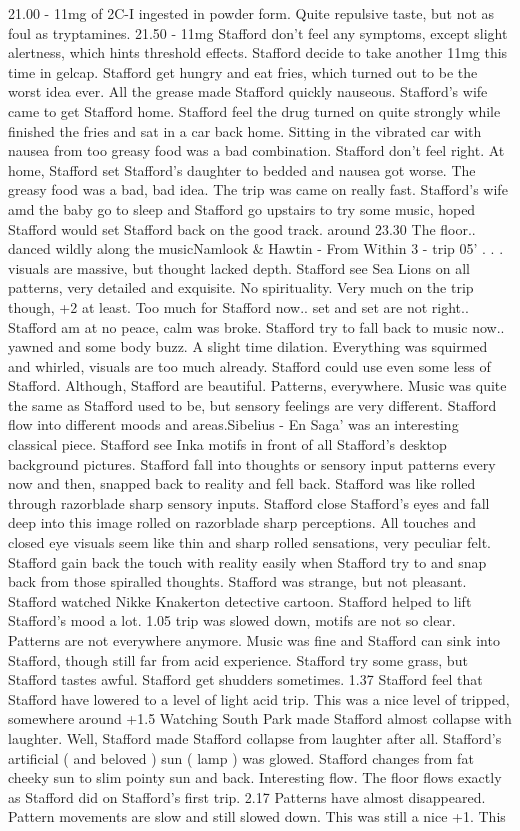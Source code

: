 \documentclass[12pt]{book}
\begin{document}
21.00 - 11mg of 2C-I ingested in powder form. Quite repulsive taste, but not as foul as tryptamines. 21.50 - 11mg Stafford don't feel any symptoms, except slight alertness, which hints threshold effects. Stafford decide to take another 11mg this time in gelcap. Stafford get hungry and eat fries, which turned out to be the worst idea ever. All the grease made Stafford quickly nauseous. Stafford's wife came to get Stafford home. Stafford feel the drug turned on quite strongly while finished the fries and sat in a car back home. Sitting in the vibrated car with nausea from too greasy food was a bad combination. Stafford don't feel right. At home, Stafford set Stafford's daughter to bedded and nausea got worse. The greasy food was a bad, bad idea. The trip was came on really fast. Stafford's wife amd the baby go to sleep and Stafford go upstairs to try some music, hoped Stafford would set Stafford back on the good track. around 23.30 The floor.. danced wildly along the musicNamlook \& Hawtin - From Within 3 - trip 05' . . .  visuals are massive, but thought lacked depth. Stafford see Sea Lions on all patterns, very detailed and exquisite. No spirituality. Very much on the trip though, +2 at least. Too much for Stafford now.. set and set are not right.. Stafford am at no peace, calm was broke. Stafford try to fall back to music now.. yawned and some body buzz. A slight time dilation. Everything was squirmed and whirled, visuals are too much already. Stafford could use even some less of Stafford. Although, Stafford are beautiful. Patterns, everywhere. Music was quite the same as Stafford used to be, but sensory feelings are very different. Stafford flow into different moods and areas.Sibelius - En Saga' was an interesting classical piece. Stafford see Inka motifs in front of all Stafford's desktop background pictures. Stafford fall into thoughts or sensory input patterns every now and then, snapped back to reality and fell back. Stafford was like rolled through razorblade sharp sensory inputs. Stafford close Stafford's eyes and fall deep into this image rolled on razorblade sharp perceptions. All touches and closed eye visuals seem like thin and sharp rolled sensations, very peculiar felt. Stafford gain back the touch with reality easily when Stafford try to and snap back from those spiralled thoughts. Stafford was strange, but not pleasant. Stafford watched Nikke Knakerton detective cartoon. Stafford helped to lift Stafford's mood a lot. 1.05 trip was slowed down, motifs are not so clear. Patterns are not everywhere anymore. Music was fine and Stafford can sink into Stafford, though still far from acid experience. Stafford try some grass, but Stafford tastes awful. Stafford get shudders sometimes. 1.37 Stafford feel that Stafford have lowered to a level of light acid trip. This was a nice level of tripped, somewhere around +1.5 Watching South Park made Stafford almost collapse with laughter. Well, Stafford made Stafford collapse from laughter after all. Stafford's artificial ( and beloved ) sun ( lamp ) was glowed. Stafford changes from fat cheeky sun to slim pointy sun and back. Interesting flow. The floor flows exactly as Stafford did on Stafford's first trip. 2.17 Patterns have almost disappeared. Pattern movements are slow and still slowed down. This was still a nice +1. This 
\end{document}
